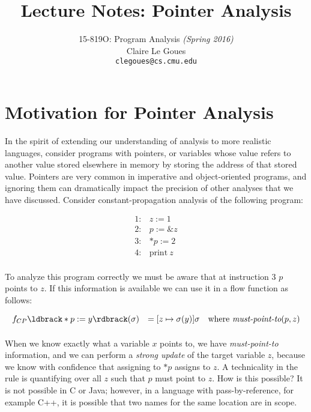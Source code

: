 \documentclass[11pt]{article}
\title{Lecture Notes:
		Pointer Analysis}
\author{15-819O: Program Analysis \emph{(Spring 2016)} \\
        Claire Le Goues \\
		{\tt clegoues@cs.cmu.edu}}
\date{}
\newcommand{\parg}[1] %
  {\ldbrack #1 \rdbrack}
\begin{document}
\begin{sloppypar}
\newtheorem{theorem}{Theorem}
\newtheorem{lemma}[theorem]{Lemma}

\maketitle

\section{Motivation for Pointer Analysis}

In the spirit of extending our understanding of analysis to more realistic languages, consider programs with pointers, or variables whose value refers to another value stored elsewhere in memory by storing the address of that stored value.  Pointers are very common in imperative and object-oriented programs, and ignoring them can dramatically impact the precision of other analyses that we have discussed.  Consider constant-propagation analysis of the following program:

\[
\begin{array}{ll}
1: & z := 1\\
2: & p := \&z\\
3: & *p := 2\\
4: & \mbox{print}~ z\\
\end{array}
\]

\noindent To analyze this program correctly we must be aware that at instruction 3 $p$ points to $z$.  If this information is available we can use it in a flow function as follows:

\[
\begin{array}{lll}

f_{CP}\parg{*p := y}(\sigma) & = [z \mapsto \sigma(y)]\sigma & \mbox{where}~ \textit{must-point-to}(p,z)\\[1ex]

\end{array}
\]

When we know exactly what a variable $x$ points to, we have \textit{must-point-to} information, and we can perform a \textit{strong update} of the target variable $z$, because we know with confidence that assigning to $*p$ assigns to $z$.  A technicality in the rule is quantifying over all $z$ such that $p$ must point to $z$.  How is this possible?  It is not possible in C or Java; however, in a language with pass-by-reference, for example C++, it is possible that two names for the same location are in scope.


\end{sloppypar}
\end{document}

